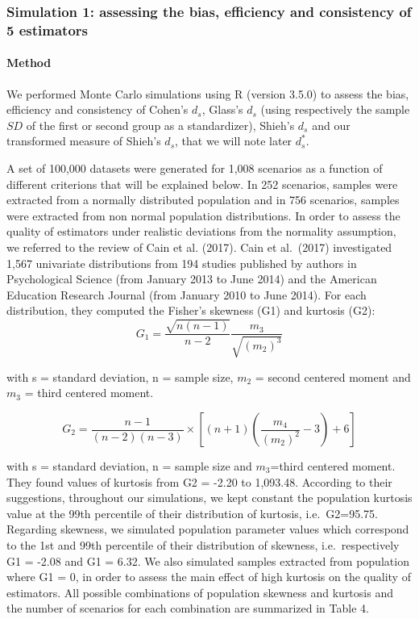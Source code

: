 \documentclass[
  man,floatsintext]{apa6}
\begin{document}
\hypertarget{simulation-1-assessing-the-bias-efficiency-and-consistency-of-5-estimators}{%
\subsubsection{Simulation 1: assessing the bias, efficiency and consistency of 5 estimators}\label{simulation-1-assessing-the-bias-efficiency-and-consistency-of-5-estimators}}

\hypertarget{method}{%
\paragraph{Method}\label{method}}

We performed Monte Carlo simulations using R (version 3.5.0) to assess the bias, efficiency and consistency of Cohen's \(d_s\), Glass's \(d_s\) (using respectively the sample \(SD\) of the first or second group as a standardizer), Shieh's \(d_s\) and our transformed measure of Shieh's \(d_s\), that we will note later \(d_s^*\).

A set of 100,000 datasets were generated for 1,008 scenarios as a function of different criterions that will be explained below. In 252 scenarios, samples were extracted from a normally distributed population and in 756 scenarios, samples were extracted from non normal population distributions. In order to assess the quality of estimators under realistic deviations from the normality assumption, we referred to the review of Cain et al. (2017). Cain et al.~(2017) investigated 1,567 univariate distributions from 194 studies published by authors in Psychological Science (from January 2013 to June 2014) and the American Education Research Journal (from January 2010 to June 2014). For each distribution, they computed the Fisher's skewness (G1) and kurtosis (G2):
\begin{equation} 
G_{1}=\frac{\sqrt{n(n-1)}}{n-2} \frac{m_{3}}{\sqrt{(m_{2})^3}}
\label{eq:skew}
\end{equation}

with s = standard deviation, n = sample size, \(m_{2}\) = second centered moment and \(m_{3}\) = third centered moment.

\begin{equation} 
G_{2}=\frac{n-1}{(n-2)(n-3)}\times [(n+1)(\frac{m_{4}}{(m_{2})^2}-3)+6]
\label{eq:kurt}
\end{equation}

with s = standard deviation, n = sample size and \(m_{3}\)=third centered moment. They found values of kurtosis from G2 = -2.20 to 1,093.48. According to their suggestions, throughout our simulations, we kept constant the population kurtosis value at the 99th percentile of their distribution of kurtosis, i.e.~G2=95.75. Regarding skewness, we simulated population parameter values which correspond to the 1st and 99th percentile of their distribution of skewness, i.e.~respectively G1 = -2.08 and G1 = 6.32. We also simulated samples extracted from population where G1 = 0, in order to assess the main effect of high kurtosis on the quality of estimators. All possible combinations of population skewness and kurtosis and the number of scenarios for each combination are summarized in Table 4.
\end{document}
